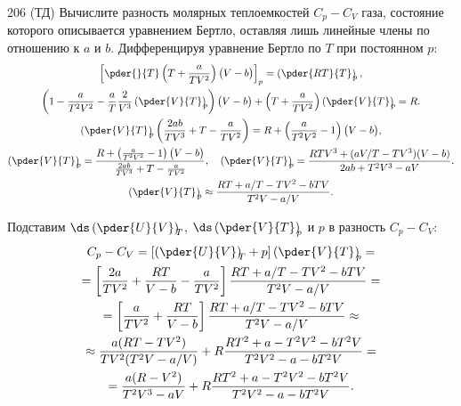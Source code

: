 \documentclass[pscyr]{hedwork}
\newcommand{\tpder}[3]{\left(\pder{#1}{#2}\right)_{\!\!#3}}
\begin{document}
\begin{task}{206 (ТД)}{
    Вычислите разность молярных теплоемкостей \( C_p - C_V \) газа, состояние
    которого описывается уравнением Бертло, оставляя лишь линейные члены по
    отношению к \( a \) и \( b \).
  }
    Дифференцируя уравнение Бертло по \( T \) при постоянном \( p \):
    \begin{gather*}
      \left[\pder{}{T}\left(T + \frac{a}{TV^2}\right)\big(V - b\big)\right]_p =
        \tpder{RT}{T}{p}, \\
      \left(1 - \frac{a}{T^2V^2} - \frac{a}{T}\frac{2}{V^3}\tpder{V}{T}{p}
        \right)\big(V - b\big) + \left(T + \frac{a}{TV^2}\right)\tpder{V}{T}{p}
        = R. \\
      \tpder{V}{T}{p}\left(\frac{2ab}{TV^3} + T - \frac{a}{TV^2}\right) =
        R + \left(\frac{a}{T^2V^2} - 1\right)\big(V - b\big), \\
      \tpder{V}{T}{p} =
        \frac{R + \left(\frac{a}{T^2V^2} - 1\right)\big(V - b\big)}
        {\frac{2ab}{TV^3} + T - \frac{a}{TV^2}}, \quad
        \tpder{V}{T}{p} =
        \frac{RTV^3 + (aV / T - TV^3)(V - b)}{2ab + T^2V^3 - aV}. \\
      \tpder{V}{T}{p} \approx \frac{RT + a/T - TV^2 - bTV}{T^2V - a/V}.
    \end{gather*}
    
    Подставим \( \ds \tpder{U}{V}{T} \), \( \ds \tpder{V}{T}{p} \) и \( p \)
    в разность \( C_p - C_V \):
    \begin{gather*}
      C_p - C_V = \left[\tpder{U}{V}{T} + p\right]\tpder{V}{T}{p} = \\
      = \left[\frac{2a}{TV^2} + \frac{RT}{V - b} - \frac{a}{TV^2}\right]
        \frac{RT + a/T - TV^2 - bTV}{T^2V - a/V} = \\
      = \left[\frac{a}{TV^2} + \frac{RT}{V - b}\right]
        \frac{RT + a/T - TV^2 - bTV}{T^2V - a/V} \approx \\
      \approx \frac{a(RT - TV^2)}{TV^2(T^2V - a/V)} +
        R\frac{RT^2 + a - T^2V^2 - bT^2V}{T^2V^2 - a - bT^2V} = \\
      = \frac{a(R - V^2)}{T^2V^3 - aV} +
        R\frac{RT^2 + a - T^2V^2 - bT^2V}{T^2V^2 - a - bT^2V}.
    \end{gather*}
  
  \end{task}
  
\end{document}
